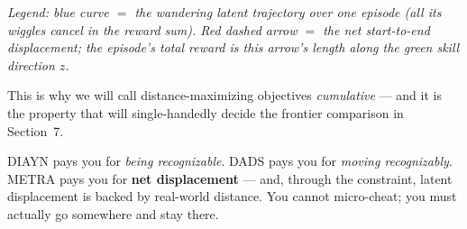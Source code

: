 \documentclass[11pt,a4paper]{article}
\begin{document}
\begin{center}

{\scriptsize\emph{Legend: blue curve $=$ the wandering latent trajectory over
one episode (all its wiggles cancel in the reward sum). Red dashed arrow $=$
the net start-to-end displacement; the episode's total reward is this arrow's
length along the green skill direction $z$.}}
\end{center}

This is why we will call distance-maximizing objectives \emph{cumulative} ---
and it is the property that will single-handedly decide the frontier comparison
in Section~7.

\begin{intuition}
DIAYN pays you for \emph{being recognizable}. DADS pays you for \emph{moving
recognizably}. METRA pays you for \textbf{net displacement} --- and, through the
constraint, latent displacement is backed by real-world distance. You cannot
micro-cheat; you must actually go somewhere and stay there.
\end{intuition}
\end{document}
